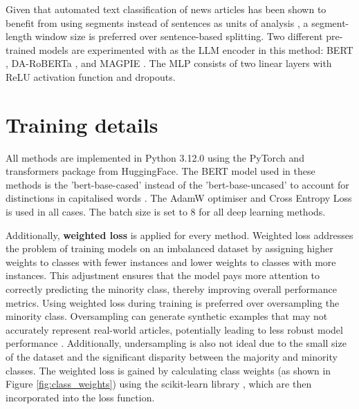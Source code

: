 Given that automated text classification of news articles has been shown to benefit from using segments instead of sentences as units of analysis \cite{barbera-2021-article-classification}, a segment-length window size is preferred over sentence-based splitting. Two different pre-trained models are experimented with as the LLM encoder in this method: BERT \cite{devlin-2019-bert}, DA-RoBERTa \cite{krieger-2022-domain}, and MAGPIE \cite{horych-2024-magpie}. The MLP consists of two linear layers with ReLU activation function \cite{agarap-2018-relu} and dropouts.

\section{Training details}

All methods are implemented in Python 3.12.0 \cite{van-1995-python} using the PyTorch \cite{paszke-2017-pytorch} and transformers \cite{wolf-2020-huggingface} package from HuggingFace. The BERT model used in these methods is the 'bert-base-cased' instead of the 'bert-base-uncased' to account for distinctions in capitalised words \cite{devlin-2019-bert}. The AdamW \cite{loshchilov-2019-adamw} optimiser and Cross Entropy Loss is used in all cases. The batch size is set to 8 for all deep learning methods.

Additionally, \textbf{weighted loss} is applied for every method. Weighted loss addresses the problem of training models on an imbalanced dataset by assigning higher weights to classes with fewer instances and lower weights to classes with more instances. This adjustment ensures that the model pays more attention to correctly predicting the minority class, thereby improving overall performance metrics. Using weighted loss during training is preferred over oversampling the minority class. Oversampling can generate synthetic examples that may not accurately represent real-world articles, potentially leading to less robust model performance \cite{alkhawaldeh-2023-challenges}. Additionally, undersampling is also not ideal due to the small size of the dataset and the significant disparity between the majority and minority classes. The weighted loss is gained by calculating class weights (as shown in Figure \ref{fig:class_weights}) using the scikit-learn library \cite{pedregosa-2011-scikit-learn}, which are then incorporated into the loss function.

